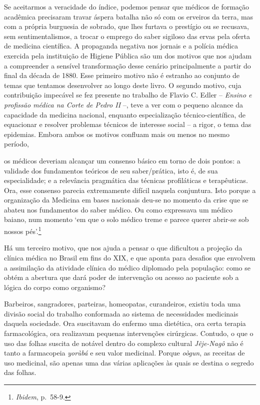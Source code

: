 Se aceitarmos a veracidade do índice, podemos pensar que médicos de
formação acadêmica precisaram travar áspera batalha não só com os
erveiros da terra, mas com a própria burguesia de sobrado, que lhes
furtava o prestígio ou se recusava, sem sentimentalismos, a trocar o
emprego do saber sigiloso das ervas pela oferta de medicina científica.
A propaganda negativa nos jornais e a polícia médica exercida pela
instituição de Higiene Pública são um dos motivos que nos ajudam a
compreender a sensível transformação desse cenário principalmente a
partir do final da década de 1880. Esse primeiro motivo não é estranho
ao conjunto de temas que tentamos desenvolver ao longo deste livro. O
segundo motivo, cuja contribuição impecável se fez presente no trabalho
de Flavio C. Edler -- \emph{Ensino e profissão médica na Corte de Pedro
II} --, teve a ver com o pequeno alcance da capacidade da medicina
nacional, enquanto especialização técnico-científica, de equacionar e
resolver problemas técnicos de interesse social -- a rigor, o tema das
epidemias. Embora ambos os motivos confluam mais ou menos no mesmo
período,

os médicos deveriam alcançar um consenso básico em torno de dois pontos:
a validade dos fundamentos teóricos de seu saber/prática, isto é, de sua
especialidade; e a relevância pragmática das técnicas profiláticas e
terapêuticas. Ora, esse consenso parecia extremamente difícil naquela
conjuntura. Isto porque a organização da Medicina em bases nacionais
deu-se no momento da crise que se abateu nos fundamentos do saber
médico. Ou como expressava um médico baiano, num momento `em que o solo
médico treme e parece querer abrir-se sob nossos pés'.\footnote{\emph{Ibidem},
  p.~58-9.}

Há um terceiro motivo, que nos ajuda a pensar o que dificultou a
projeção da clínica médica no Brasil em fins do XIX, e que aponta para
desafios que envolvem a assimilação da atividade clínica do médico
diplomado pela população: como se obtém a abertura que dará poder de
intervenção ou acesso ao paciente sob a lógica do corpo como organismo?

Barbeiros, sangradores, parteiras, homeopatas, curandeiros, existiu toda
uma divisão social do trabalho conformada ao sistema de necessidades
medicinais daquela sociedade. Ora suscitavam do enfermo uma dietética,
ora certa terapia farmacológica, ora realizavam pequenas intervenções
cirúrgicas. Contudo, o que o uso das folhas suscita de notável dentro do
complexo cultural \emph{Jêje-Nagô} não é tanto a farmacopeia
\emph{yorùbá} e seu valor medicinal. Porque \emph{oògun}, as receitas de
uso medicinal, são apenas uma das várias aplicações às quais se destina
o segredo das folhas.


